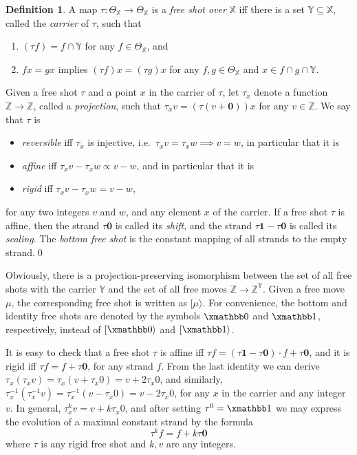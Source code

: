 \documentclass [a4paper,12pt] {article}
\theoremstyle{definition}
\newtheorem{definition}{Definition}[section]
\newcommand{\domain}{}
\DeclareRobustCommand{\domain}{\mathop{\textstyle\mathsmaller{\bf {Dom}}}}
\begin{document}
\begin {definition}\label{def-free-shot}
  A map $\tau\!: \Theta_{\mathbb X} \rightarrow \Theta_{\mathbb X}$ is
  a {\em free shot over}\/ ${\mathbb X}$ iff there is a set ${\mathbb
    Y} \subseteq {\mathbb X}$, called the {\em carrier}\/ of $\tau$,
  such that
  \begin {enumerate}
  \item $\domain{(\tau f)} = \domain{f} \cap {\mathbb Y}$ for any $f
    \in \Theta_{\mathbb X}$, and
  \item $fx = gx$ implies $(\tau f)x = (\tau g)x$ for any $f, g \in
    \Theta_{\mathbb X}$ and $x \in \domain{f} \cap \domain{g} \cap
          {\mathbb Y}$.
  \end {enumerate}

  Given a free shot $\tau$ and a point $x$ in the carrier of $\tau$,
  let $\tau_x$ denote a function ${\mathbb Z} \rightarrow {\mathbb
    Z}$, called a {\em projection}\/, such that $\tau_x v = (\tau (v +
  \bm{0})) x$ for any $v \in {\mathbb Z}$.  We say that $\tau$ is
  \begin {itemize}
  \item {\em reversible}\/ iff $\tau_x$ is injective, i.e.\ $\tau_x v
    = \tau_x w \implies v = w$, in particular that it is
  \item {\em affine}\/ iff $\tau_x v - \tau_x w \propto v - w$, and in
    particular that it is
  \item {\em rigid}\/ iff $\tau_x v - \tau_x w = v - w$,
  \end {itemize}
  for any two integers $v$ and $w$, and any element $x$ of the
  carrier.  If a free shot $\tau$ is affine, then the strand
  $\tau\bm{0}$ is called its {\em shift}\/, and the strand $\tau\bm{1}
  - \tau\bm{0}$ is called its {\em scaling}\/.  The {\em bottom free
    shot}\/ is the constant mapping of all strands to the empty
  strand.\qed
\end {definition}

Obviously, there is a projection-preserving isomorphism between the
set of all free shots with the carrier ${\mathbb Y}$ and the set of
all free moves ${\mathbb Z} \rightarrow {\mathbb Z}^{\mathbb Y}$.
Given a free move $\mu$, the corresponding free shot is written as
$[\mu\rangle$.  For convenience, the bottom and identity free shots
  are denoted by the symbols ${\xmathbb 0}$ and ${\xmathbb 1}$,
  respectively, instead of $[{\xmathbb 0}\rangle$ and $[{\xmathbb
        1}\rangle$.

It is easy to check that a free shot $\tau$ is affine iff $\tau f =
(\tau\bm{1} - \tau\bm{0}) \cdot f + \tau\bm{0}$, and it is rigid iff
$\tau f = f + \tau\bm{0}$, for any strand $f$.  From the last identity
we can derive $\tau_x (\tau_x v) = \tau_x (v + \tau_x 0) = v + 2\tau_x
0$, and similarly, $\tau_x^{-1} (\tau_x^{-1} v) = \tau_x^{-1} (v -
\tau_x 0) = v - 2\tau_x 0$, for any $x$ in the carrier and any integer
$v$.  In general, $\tau_x^k v = v + k\tau_x 0$, and after setting
$\tau^0 = {\xmathbb 1}$ we may express the evolution of a maximal
constant strand by the formula
%
\[\tau^k f = f + k\tau\bm{0}\]
%
where $\tau$ is any rigid free shot and $k, v$ are any integers.
\end{document}
